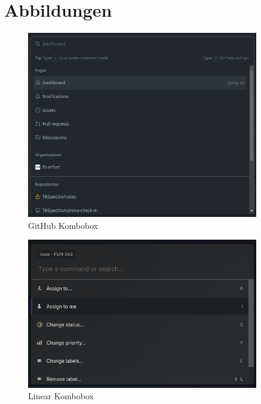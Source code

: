 \chapter{Abbildungen}
\label{appendix:images}

\begin{figure}[th]
    \centering
    \includegraphics[width=0.9\textwidth]{Figures/cmdk_github.png}
    \decoRule
    \caption[GitHub Kombobox]{GitHub Kombobox}
    \label{fig:cmdk_github}
\end{figure}

\begin{figure}[th]
    \centering
    \includegraphics[width=0.9\textwidth]{Figures/cmdk_linear.png}
    \decoRule
    \caption[Linear Kombobox]{Linear Kombobox}
    \label{fig:cmdk_linear}
\end{figure}

